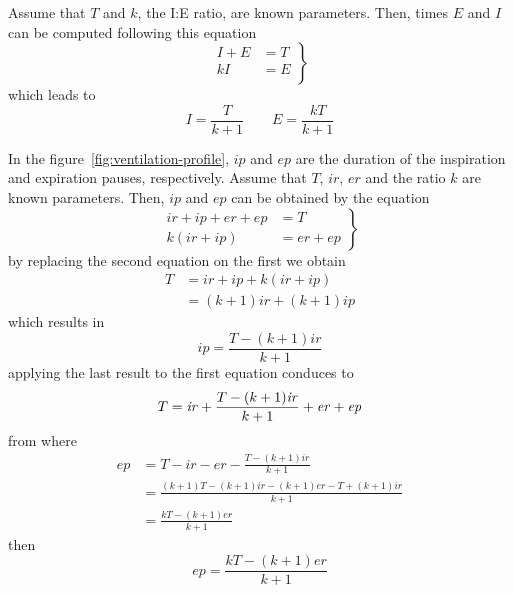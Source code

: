 \documentclass[a4paper]{article}
\begin{document}
Assume that $T$ and $k$, the I:E ratio, are known parameters. Then,
times $E$ and $I$ can be computed following this equation
\begin{equation*}
  \left.
    \begin{aligned}
      I+E &= T \\
      kI  &= E \\
    \end{aligned}
  \right\}
\end{equation*}
which leads to
\begin{equation}
  \label{eq:19}
  \boxed{
    I = \frac{T}{k+1} \qquad E = \frac{kT}{k+1}
  }
\end{equation}

In the figure~\ref{fig:ventilation-profile}, $\mathit{ip}$ and
$\mathit{ep}$ are the duration of the inspiration and expiration
pauses, respectively. Assume that $T$, $\mathit{ir}$, $\mathit{er}$
and the ratio $k$ are known parameters. Then, $\mathit{ip}$ and
$\mathit{ep}$ can be obtained by the equation
\begin{equation*}
  \left.
    \begin{aligned}
      \mathit{ir}+\mathit{ip}+\mathit{er}+\mathit{ep} &= T \\
      k(\mathit{ir}+\mathit{ip}) &= \mathit{er}+\mathit{ep}
    \end{aligned}
  \right\}
\end{equation*}
by replacing the second equation on the first we obtain
\begin{equation*}
  \begin{split}
    T &= \mathit{ir}+\mathit{ip}+k(\mathit{ir}+\mathit{ip}) \\
      &= (k+1)\mathit{ir} + (k+1)\mathit{ip}
  \end{split}
\end{equation*}
which results in
\begin{equation}
  \label{eq:20}
  \boxed{
    \mathit{ip} = \frac{T-(k+1)\mathit{ir}}{k+1}
  }
\end{equation}
applying the last result to the first equation conduces to
\begin{equation*}
  T = \mathit{ir}+\frac{T-(k+1)\mathit{ir}}{k+1}+\mathit{er}+\mathit{ep}\\
\end{equation*}
from where
\begin{equation*}
  \begin{split}
    \mathit{ep} &=
    T-\mathit{ir}-\mathit{er}-\frac{T-(k+1)\mathit{ir}}{k+1}\\
    &=
    \frac{(k+1)T-(k+1)\mathit{ir}-(k+1)\mathit{er}-T+(k+1)\mathit{ir}}
    {k+1}\\
    &= \frac{kT-(k+1)\mathit{er}}{k+1}
  \end{split}
\end{equation*}
then
\begin{equation}
  \label{eq:25}
  \boxed{
    \mathit{ep} = \frac{kT-(k+1)\mathit{er}}{k+1}
  }
\end{equation}
\end{document}
